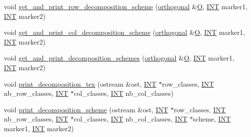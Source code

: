 \begin{DoxyCompactItemize}
\item 
void \mbox{\hyperlink{classpartitionstack_a35a6b8e1f8c035a619673e618343d334}{get\+\_\+and\+\_\+print\+\_\+row\+\_\+decomposition\+\_\+scheme}} (\mbox{\hyperlink{classorthogonal}{orthogonal}} \&\mbox{\hyperlink{pentomino__5x5_8_c_a0824fca46b94fc0ff4ae72f3c56481aa}{O}}, \mbox{\hyperlink{galois_8h_a09fddde158a3a20bd2dcadb609de11dc}{I\+NT}} marker1, \mbox{\hyperlink{galois_8h_a09fddde158a3a20bd2dcadb609de11dc}{I\+NT}} marker2)
\item 
void \mbox{\hyperlink{classpartitionstack_aab0912fcdea4cdcc60f3060c23b0f91b}{get\+\_\+and\+\_\+print\+\_\+col\+\_\+decomposition\+\_\+scheme}} (\mbox{\hyperlink{classorthogonal}{orthogonal}} \&\mbox{\hyperlink{pentomino__5x5_8_c_a0824fca46b94fc0ff4ae72f3c56481aa}{O}}, \mbox{\hyperlink{galois_8h_a09fddde158a3a20bd2dcadb609de11dc}{I\+NT}} marker1, \mbox{\hyperlink{galois_8h_a09fddde158a3a20bd2dcadb609de11dc}{I\+NT}} marker2)
\item 
void \mbox{\hyperlink{classpartitionstack_ac4881b617c6c6e66c9f97ecf0b933c69}{get\+\_\+and\+\_\+print\+\_\+decomposition\+\_\+schemes}} (\mbox{\hyperlink{classorthogonal}{orthogonal}} \&\mbox{\hyperlink{pentomino__5x5_8_c_a0824fca46b94fc0ff4ae72f3c56481aa}{O}}, \mbox{\hyperlink{galois_8h_a09fddde158a3a20bd2dcadb609de11dc}{I\+NT}} marker1, \mbox{\hyperlink{galois_8h_a09fddde158a3a20bd2dcadb609de11dc}{I\+NT}} marker2)
\item 
void \mbox{\hyperlink{classpartitionstack_a03002ce13980e4fc68f4b6ca68afb2f1}{print\+\_\+decomposition\+\_\+tex}} (ostream \&ost, \mbox{\hyperlink{galois_8h_a09fddde158a3a20bd2dcadb609de11dc}{I\+NT}} $\ast$row\+\_\+classes, \mbox{\hyperlink{galois_8h_a09fddde158a3a20bd2dcadb609de11dc}{I\+NT}} nb\+\_\+row\+\_\+classes, \mbox{\hyperlink{galois_8h_a09fddde158a3a20bd2dcadb609de11dc}{I\+NT}} $\ast$col\+\_\+classes, \mbox{\hyperlink{galois_8h_a09fddde158a3a20bd2dcadb609de11dc}{I\+NT}} nb\+\_\+col\+\_\+classes)
\item 
void \mbox{\hyperlink{classpartitionstack_a988c07dc47753333f43dfc393f86f3f7}{print\+\_\+decomposition\+\_\+scheme}} (ostream \&ost, \mbox{\hyperlink{galois_8h_a09fddde158a3a20bd2dcadb609de11dc}{I\+NT}} $\ast$row\+\_\+classes, \mbox{\hyperlink{galois_8h_a09fddde158a3a20bd2dcadb609de11dc}{I\+NT}} nb\+\_\+row\+\_\+classes, \mbox{\hyperlink{galois_8h_a09fddde158a3a20bd2dcadb609de11dc}{I\+NT}} $\ast$col\+\_\+classes, \mbox{\hyperlink{galois_8h_a09fddde158a3a20bd2dcadb609de11dc}{I\+NT}} nb\+\_\+col\+\_\+classes, \mbox{\hyperlink{galois_8h_a09fddde158a3a20bd2dcadb609de11dc}{I\+NT}} $\ast$scheme, \mbox{\hyperlink{galois_8h_a09fddde158a3a20bd2dcadb609de11dc}{I\+NT}} marker1, \mbox{\hyperlink{galois_8h_a09fddde158a3a20bd2dcadb609de11dc}{I\+NT}} marker2)

\end{DoxyCompactItemize}
